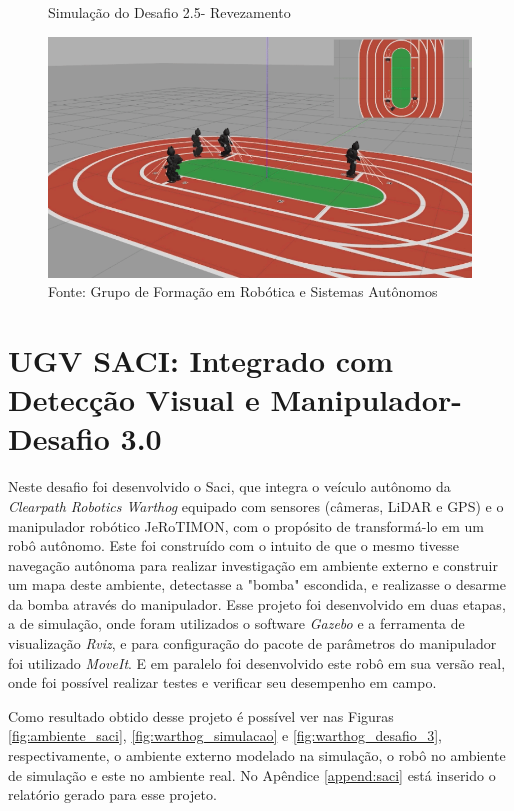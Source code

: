 \begin{figure}[H]
    \caption{Simulação do Desafio 2.5- Revezamento}
    \centering
    \includegraphics[width= \textwidth]{Figures/revezamento.png}
    \caption*{Fonte: Grupo de Formação em Robótica e Sistemas Autônomos}
    \label{fig:revezamento_darwinop}
\end{figure}

\section{UGV SACI: Integrado com Detecção Visual e Manipulador- Desafio 3.0}
\label{sec:desafio_3_0}
Neste desafio foi desenvolvido o Saci, que integra o veículo autônomo da \textit{Clearpath Robotics Warthog} equipado com sensores (câmeras, LiDAR e GPS) e o manipulador robótico JeRoTIMON, com o propósito de transformá-lo em um robô autônomo. Este foi construído com o intuito de que o mesmo tivesse navegação autônoma para realizar investigação em ambiente externo e construir um mapa deste ambiente, detectasse a "bomba" escondida, e realizasse o desarme da bomba através do manipulador. 
Esse projeto foi desenvolvido em duas etapas, a de simulação, onde foram utilizados o software  \textit{Gazebo} e a ferramenta de visualização \textit{Rviz}, e para configuração do pacote de parâmetros do manipulador foi utilizado \textit{MoveIt}. E em paralelo foi desenvolvido este robô em sua versão real, onde foi possível realizar testes e verificar seu desempenho em campo.

Como resultado obtido desse projeto é possível ver nas Figuras \ref{fig:ambiente_saci}, \ref{fig:warthog_simulacao} e \ref{fig:warthog_desafio_3}, respectivamente, o ambiente externo modelado na simulação, o robô no ambiente de simulação e este no ambiente real. No Apêndice \ref{append:saci} está inserido o relatório gerado para esse projeto.


